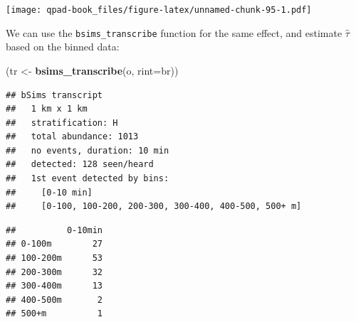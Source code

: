 \documentclass[12pt,]{book}
\newenvironment{Shaded}{\begin{snugshade}}{\end{snugshade}}
\newcommand{\DataTypeTok}[1]{\textcolor[rgb]{0.13,0.29,0.53}{#1}}
\newcommand{\DecValTok}[1]{\textcolor[rgb]{0.00,0.00,0.81}{#1}}
\newcommand{\KeywordTok}[1]{\textcolor[rgb]{0.13,0.29,0.53}{\textbf{#1}}}
\newcommand{\NormalTok}[1]{#1}
\newcommand{\OperatorTok}[1]{\textcolor[rgb]{0.81,0.36,0.00}{\textbf{#1}}}
\newcommand{\StringTok}[1]{\textcolor[rgb]{0.31,0.60,0.02}{#1}}
\begin{document}
\texttt{[image: qpad-book\_files/figure-latex/unnamed-chunk-95-1.pdf]}

We can use the \texttt{bsims\_transcribe} function for the same effect,
and estimate \(\hat{\tau}\) based on the binned data:

\begin{Shaded}
\begin{Highlighting}[]
\NormalTok{(tr <-}\StringTok{ }\KeywordTok{bsims_transcribe}\NormalTok{(o, }\DataTypeTok{rint=}\NormalTok{br))}
\end{Highlighting}
\end{Shaded}

\begin{verbatim}
## bSims transcript
##   1 km x 1 km
##   stratification: H
##   total abundance: 1013
##   no events, duration: 10 min
##   detected: 128 seen/heard
##   1st event detected by bins:
##     [0-10 min]
##     [0-100, 100-200, 200-300, 300-400, 400-500, 500+ m]
\end{verbatim}

\begin{Shaded}
\end{Shaded}

\begin{verbatim}
##          0-10min
## 0-100m        27
## 100-200m      53
## 200-300m      32
## 300-400m      13
## 400-500m       2
## 500+m          1
\end{verbatim}

\begin{Shaded}
\end{Shaded}
\end{document}
